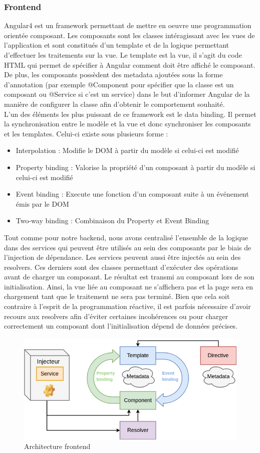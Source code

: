 \subsubsection{Frontend}

	Angular4 est un framework permettant de mettre en oeuvre une programmation orientée composant. Les composants sont les classes intéragissant avec les vues de l'application et sont constitués d'un template et de la logique permettant d'effectuer les traitements sur la vue. Le template est la vue, il s'agit du code HTML qui permet de spécifier à Angular comment doit être affiché le composant. De plus, les composants possèdent des metadata ajoutées sous la forme d'annotation (par exemple @Component pour spécifier que la classe est un composant ou @Service si c'est un service) dans le but d'informer Angular de la manière de configurer la classe afin d'obtenir le comportement souhaité. \\
	
	L'un des éléments les plus puissant de ce framework est le data binding. Il permet la synchronisation entre le modèle et la vue et donc synchroniser les composants et les templates. Celui-ci existe sous plusieurs forme :
	\begin{itemize}
		\item Interpolation : Modifie le DOM à partir du modèle si celui-ci est modifié
		\item Property binding : Valorise la propriété d'un composant à partir du modèle si celui-ci est modifié
		\item Event binding : Execute une fonction d'un composant suite à un événement émis par le DOM
		\item Two-way binding : Combinaison du Property et Event Binding \\
	\end{itemize}

	Tout comme pour notre backend, nous avons centralisé l'ensemble de la logique dans des services qui peuvent être utilisés au sein des composants par le biais de l'injection de dépendance. Les services peuvent aussi être injectés au sein des resolvers. Ces derniers sont des classes permettant d'exécuter des opérations avant de charger un composant. Le résultat est transmi au composant lors de son initialisation. Ainsi, la vue liée au composant ne s'affichera pas et la page sera en chargement tant que le traitement ne sera pas terminé. Bien que cela soit contraire à l'esprit de la programmation réactive, il est parfois nécessaire d'avoir recours aux resolvers afin d'éviter certaines incohérences ou pour charger correctement un composant dont l'initialisation dépend de données précises.

\begin{figure}[h!]
	\includegraphics[scale=0.50]{images/travailBP1818/architecture/angularArchi.png}
	\centering
	\caption{Architecture frontend}
	\label{angularArchi}
\end{figure}
